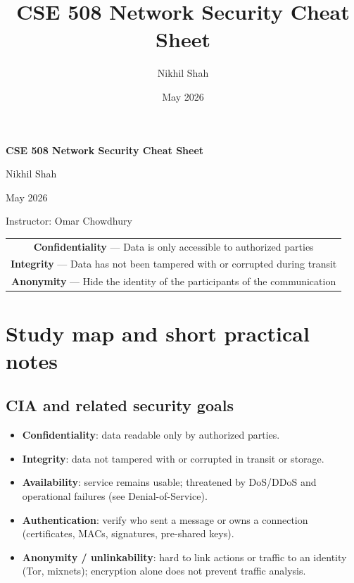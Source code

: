 \documentclass[12pt]{article}
\title{CSE 508 Network Security Cheat Sheet}
\author{Nikhil Shah}
\date{May 2026}
\begin{document}
\begin{titlepage}
\centering
{\LARGE\bfseries CSE 508 Network Security Cheat Sheet\par}
\vspace{1.5em}
{\large Nikhil Shah\par}
{\normalsize May 2026\par}
\vspace{1em}
{\normalsize Instructor: Omar Chowdhury\par}
\vspace{2em}
\hrulefill\par
\vspace{0.8em}
{\small
\begin{tabular}{c}
\textbf{Confidentiality}\index{confidentiality} --- Data is only accessible to authorized parties \\
\textbf{Integrity}\index{integrity} --- Data has not been tampered with or corrupted during transit \\
\textbf{Anonymity}\index{anonymity} --- Hide the identity of the participants of the communication
\end{tabular}
}
\par\vspace{0.8em}\hrulefill
\end{titlepage}

\renewcommand{\contentsname}{Table of Contents}
{\footnotesize\setlength{\parskip}{0.35ex}\tableofcontents}
\clearpage

\section{Study map and short practical notes}

\subsection{CIA and related security goals}
\begin{itemize}
  \item \textbf{Confidentiality}: data readable only by authorized parties.
  \item \textbf{Integrity}: data not tampered with or corrupted in transit or storage.
  \item \textbf{Availability}: service remains usable; threatened by DoS/DDoS and operational failures (see Denial-of-Service).
  \item \textbf{Authentication}: verify who sent a message or owns a connection (certificates, MACs, signatures, pre-shared keys).
  \item \textbf{Anonymity / unlinkability}: hard to link actions or traffic to an identity (Tor, mixnets); encryption alone does not prevent traffic analysis.
\end{itemize}
\end{document}
